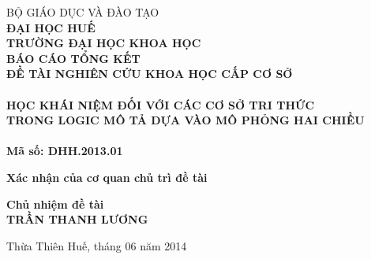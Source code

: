 \begin{titlepage}
\begin{center}

\textsc{BỘ GIÁO DỤC VÀ ĐÀO TẠO}\\[0.0cm]
\textsc{\textbf{ĐẠI HỌC HUẾ}}\\[0.0cm]
{\textbf{TRƯỜNG ĐẠI HỌC KHOA HỌC}}\\[4.5cm]

\textsc{\LARGE \textbf{BÁO CÁO TỔNG KẾT}}\\[0.3cm]
\textsc{\Large \textbf{ĐỀ TÀI NGHIÊN CỨU KHOA HỌC CẤP CƠ SỞ}}\\[0.3cm]

\HRule \\[0.5cm]
{\large \bfseries HỌC KHÁI NIỆM ĐỐI VỚI CÁC CƠ SỞ TRI THỨC\\TRONG LOGIC MÔ TẢ DỰA VÀO MÔ PHỎNG HAI CHIỀU}\\[0.4cm]
\HRule \\[0.3cm]
\textbf{Mã số: DHH.2013.01}\\[1.5cm]
\begin{minipage}{0.55\textwidth}
\begin{flushleft}
\textbf{Xác nhận của cơ quan chủ trì đề tài}\\[2cm]
\textbf{}
\end{flushleft}
\end{minipage}
\begin{minipage}{0.35\textwidth}
\begin{center}
\textbf{Chủ nhiệm đề tài}\\[2cm]
\textbf{TRẦN THANH LƯƠNG}
\end{center}
\end{minipage}

\vfill
Thừa Thiên Huế, tháng 06 năm 2014
\vspace{-5ex}
\end{center}
\end{titlepage}